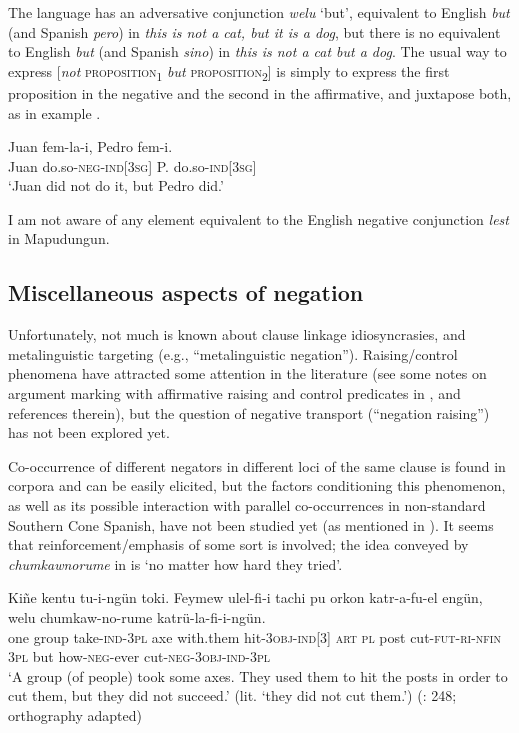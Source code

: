 \documentclass[output=paper,colorlinks,citecolor=brown,draft]{langscibook}
\begin{document}
    \z
\z 
 
The language has an adversative conjunction \textit{welu} ‘but’, equivalent to English \textit{but} (and Spanish \textit{pero}) in \textit{this is not a cat, but it is a dog}, but there is no equivalent to English \textit{but} (and Spanish \textit{sino}) in \textit{this is not a cat but a dog}. The usual way to express [\textit{not} \textsc{proposition}\textsubscript{1} \textit{but} \textsc{proposition}\textsubscript{2}] is simply to express the first proposition in the negative and the second in the affirmative, and juxtapose both, as in example .
 
\ea\label{ex:mapu:28}
    \gll Juan  fem-la-i,      Pedro    fem-i. \\ 
         Juan  do.so-\textsc{neg-ind[3sg]} \textsc{P.} do.so-\textsc{ind[3sg]} \\
    \glt ‘Juan did not do it, but Pedro did.’ \citep[356]{Augusta1916}

\z 
 
I am not aware of any element equivalent to the English negative conjunction \textit{lest} in Mapudungun.

\subsection{Miscellaneous aspects of negation}

Unfortunately, not much is known about clause linkage idiosyncrasies, and metalinguistic targeting (e.g., “metalinguistic negation”). Raising/control phenomena have attracted some attention in the literature (see some notes on argument marking with affirmative raising and control predicates in \citealt{Zúñiga2019}, and references therein), but the question of negative transport (“negation raising”) has not been explored yet.

Co-occurrence of different negators in different loci of the same clause is found in corpora and can be easily elicited, but the factors conditioning this phenomenon, as well as its possible interaction with parallel co-occurrences in non-standard Southern Cone Spanish, have not been studied yet (as mentioned in ). It seems that reinforcement/emphasis of some sort is involved; the idea conveyed by \textit{chumkawnorume} in  is ‘no matter how hard they tried’.


\ea\label{ex:mapu:29}
    \gll Kiñe  kentu    tu-i-ngün    toki. Feymew  ulel-fi-i    tachi  pu  orkon katr-a-fu-el    engün,  welu chumkaw-no-rume    katrü-la-fi-i-ngün.\\ 
         one  group    take-\textsc{ind-3pl} axe with.them  hit-\textsc{3obj-ind[3]}  \textsc{art}  \textsc{pl} post cut-\textsc{fut-ri-nfin} \textsc{3pl} but how-\textsc{neg-}ever    cut-\textsc{neg-3obj-ind-3pl}\\
    \glt ‘A group (of people) took some axes. They used them to hit the posts in order to cut them, but they did not succeed.’ (lit. ‘they did not cut them.’) (\citealt{Salas2006}: 248; orthography adapted)
\z 
\end{document}
